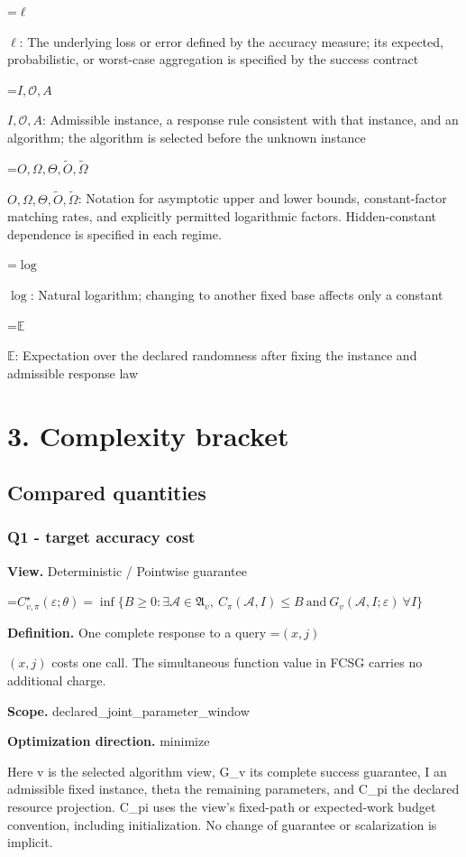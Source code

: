 \documentclass[10pt,a4paper]{article}
\newcommand{\AtlasMath}[1]{\par\begingroup\centering\setbox0=\hbox{$\displaystyle #1$}\ifdim\wd0>1.4\linewidth\typeout{ATLAS WIDE FORMULA: \the\wd0}\fi\ifdim\wd0>\linewidth\resizebox{\linewidth}{!}{\box0}\else\box0\fi\par\endgroup}
\newcommand{\AtlasInlineMath}[1]{\begingroup\setbox0=\hbox{$#1$}\ifdim\wd0>.4\linewidth\endgroup\AtlasMath{#1}\else\endgroup$#1$\fi}
\begin{document}
\AtlasInlineMath{\ell}: The underlying loss or error defined by the accuracy measure; its expected, probabilistic, or worst-case aggregation is specified by the success contract

\AtlasInlineMath{I,\mathcal{O},A}: Admissible instance, a response rule consistent with that instance, and an algorithm; the algorithm is selected before the unknown instance

\AtlasInlineMath{O,\Omega,\Theta,\widetilde{O},\widetilde\Omega}: Notation for asymptotic upper and lower bounds, constant-factor matching rates, and explicitly permitted logarithmic factors. Hidden-constant dependence is specified in each regime.

\AtlasInlineMath{\log}: Natural logarithm; changing to another fixed base affects only a constant

\AtlasInlineMath{\mathbb{E}}: Expectation over the declared randomness after fixing the instance and admissible response law

\section{3. Complexity bracket}
\subsection{Compared quantities}
\subsubsection{Q1 - target accuracy cost}
\textbf{View.} Deterministic / Pointwise guarantee

\AtlasMath{C^\star_{v,\pi}(\varepsilon;\theta)=\inf\{B\ge0:\exists\mathcal A\in\mathfrak A_v,\ C_\pi(\mathcal A,I)\le B\ \text{and}\ G_v(\mathcal A,I;\varepsilon)\ \forall I\}}
\textbf{Definition.} One complete response to a query \AtlasInlineMath{(x,j)} costs one call. The simultaneous function value in FCSG carries no additional charge.

\textbf{Scope.} declared\_joint\_parameter\_window

\textbf{Optimization direction.} minimize

Here v is the selected algorithm view, G\_v its complete success guarantee, I an admissible fixed instance, theta the remaining parameters, and C\_pi the declared resource projection. C\_pi uses the view's fixed-path or expected-work budget convention, including initialization. No change of guarantee or scalarization is implicit.
\end{document}
